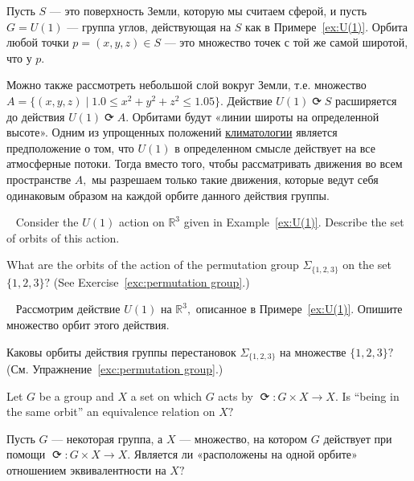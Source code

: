 \documentclass[../main/CT4S-EN-RU]{subfiles}
\begin{document}
\begin{applicationRUS}
Пусть $S$ — это поверхность Земли, которую мы считаем сферой, и пусть $G=U(1)$ — группа углов, действующая на $S$ как в Примере~\ref{ex:U(1)}. Орбита любой точки $p=(x,y,z)\in S$ — это множество точек с той же самой широтой, что у $p.$

Можно также рассмотреть небольшой слой вокруг Земли, т.е. множество $A=\{(x,y,z){\;|\;}1.0\leq x^2+y^2+z^2\leq 1.05\}.$ Действие $U(1){⟳} S$ расширяется до действия $U(1){⟳} A.$ Орбитами будут «линии широты на определенной высоте». Одним из упрощенных положений \href{https://ru.wikipedia.org/wiki/%D0%9A%D0%BB%D0%B8%D0%BC%D0%B0%D1%82%D0%BE%D0%BB%D0%BE%D0%B3%D0%B8%D1%8F}{\text климатологии} является предположение о том, что $U(1)$ в определенном смысле действует на все атмосферные потоки. Тогда вместо того, чтобы рассматривать движения во всем пространстве $A,$ мы разрешаем только такие движения, которые ведут себя одинаковым образом на каждой орбите данного действия группы.
\end{applicationRUS}

\begin{exerciseENG}~
\sexc Consider the $U(1)$ action on ${ℝ}^3$ given in Example~\ref{ex:U(1)}. Describe the set of orbits of this action.
\item What are the orbits of the action of the permutation group ${Σ}_{\{1,2,3\}}$ on the set $\{1,2,3\}?$ (See Exercise~\ref{exc:permutation group}.)
\endsexc
\end{exerciseENG}

\begin{exerciseRUS}~
\sexc Рассмотрим действие $U(1)$ на ${ℝ}^3,$ описанное в Примере~\ref{ex:U(1)}. Опишите множество орбит этого действия.
\item Каковы орбиты действия группы перестановок ${Σ}_{\{1,2,3\}}$ на множестве $\{1,2,3\}?$ (См. Упражнение~\ref{exc:permutation group}.)
\endsexc
\end{exerciseRUS}

\begin{exerciseENG}
Let $G$ be a group and $X$ a set on which $G$ acts by ${⟳}\colon G\times X{→} X.$ Is “being in the same orbit” an equivalence relation on $X?$ 
\end{exerciseENG}

\begin{exerciseRUS}
Пусть $G$ — некоторая группа, а $X$ — множество, на котором $G$ действует при помощи ${⟳}\colon G\times X{→} X.$ Является ли «расположены на одной орбите» отношением эквивалентности на $X?$ 
\end{exerciseRUS}
\end{document}

